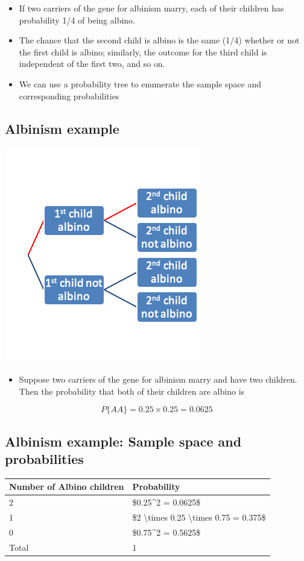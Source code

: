 \documentclass[
]{book}
\providecommand{\tightlist}{%
  \setlength{\itemsep}{0pt}\setlength{\parskip}{0pt}}
\begin{document}
\begin{itemize}
\tightlist
\item
  If two carriers of the gene for albinism marry, each of their children has probability 1/4 of being albino.
\item
  The chance that the second child is albino is the same (1/4) whether or not the first child is albino; similarly, the outcome for the third child is independent of the first two, and so on.
\item
  We can use a probability tree to enumerate the sample space and corresponding probabilities
\end{itemize}

\hypertarget{albinism-example}{%
\subsection{Albinism example}\label{albinism-example}}

\includegraphics[width=0.5\linewidth]{./2_26}

\begin{itemize}
\tightlist
\item
  Suppose two carriers of the gene for albinism marry and have two children. Then the probability that both of their children are albino is
\end{itemize}

\[P\{AA\} 
    = 0.25 × 0.25
    = 0.0625\]

\hypertarget{albinism-example-sample-space-and-probabilities}{%
\subsection{Albinism example: Sample space and probabilities}\label{albinism-example-sample-space-and-probabilities}}

\begin{tabular}{l|l}
\hline
Number of Albino children & Probability\\
\hline
2 & \$0.25\textasciicircum{}2 = 0.0625\$\\
\hline
1 & \$2 \textbackslash{}times 0.25 \textbackslash{}times 0.75 = 0.375\$\\
\hline
0 & \$0.75\textasciicircum{}2 = 0.5625\$\\
\hline
Total & 1\\
\hline
\end{tabular}
\end{document}
